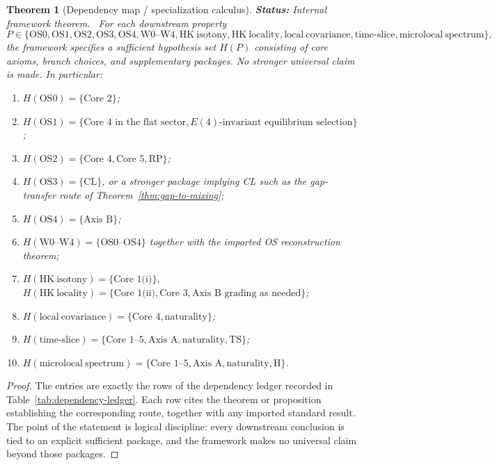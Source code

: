 \documentclass[12pt,a4paper]{article}
\theoremstyle{plain}
\newtheorem{theorem}{Theorem}[section]
\theoremstyle{definition}
\theoremstyle{remark}
\newcommand{\status}[1]{\textnormal{\textbf{Status:} #1.}\ }
\begin{document}
\begin{theorem}[Dependency map / specialization calculus]
  \label{thm:dependency-map}
  \status{Internal framework theorem}
  For each downstream property
  \[
    P \in \{
    \mathrm{OS0},\mathrm{OS1},\mathrm{OS2},\mathrm{OS3},\mathrm{OS4},
    \mathrm{W0\text{--}W4},
    \mathrm{HK\ isotony},
    \mathrm{HK\ locality},
    \mathrm{local\ covariance},
    \mathrm{time\text{-}slice},
    \mathrm{microlocal\ spectrum}
    \},
  \]
  the framework specifies a sufficient hypothesis set \(H(P)\)
  consisting of core axioms, branch choices, and supplementary
  packages. No stronger universal claim is made. In particular:
  \begin{enumerate}[nosep,label=(\roman*)]
  \item \(H(\mathrm{OS0}) = \{\text{Core 2}\}\);
  \item \(H(\mathrm{OS1}) = \{\text{Core 4 in the flat sector},
    E(4)\text{-invariant equilibrium selection}\}\);
  \item \(H(\mathrm{OS2}) = \{\text{Core 4},\text{Core 5},\mathrm{RP}\}\);
  \item \(H(\mathrm{OS3}) = \{\mathrm{CL}\}\), or a stronger package
    implying CL such as the gap-transfer route of
    Theorem~\ref{thm:gap-to-mixing};
  \item \(H(\mathrm{OS4}) = \{\text{Axis B}\}\);
  \item \(H(\mathrm{W0\text{--}W4}) = \{\mathrm{OS0\text{--}OS4}\}\)
    together with the imported OS reconstruction theorem;
  \item \(H(\mathrm{HK\ isotony}) = \{\text{Core 1(i)}\}\),
    \(H(\mathrm{HK\ locality}) = \{\text{Core 1(ii)},\text{Core 3},
    \text{Axis B grading as needed}\}\);
  \item \(H(\mathrm{local\ covariance}) = \{\text{Core 4},
    \text{naturality}\}\);
  \item \(H(\mathrm{time\text{-}slice}) = \{\text{Core 1--5},
    \text{Axis A},\text{naturality},\mathrm{TS}\}\);
  \item \(H(\mathrm{microlocal\ spectrum}) = \{\text{Core 1--5},
    \text{Axis A},\text{naturality},\mathrm{H}\}\).
  \end{enumerate}
\end{theorem}
\begin{proof}
  The entries are exactly the rows of the dependency ledger recorded
  in Table~\ref{tab:dependency-ledger}. Each row cites the theorem or
  proposition establishing the corresponding route, together with any
  imported standard result. The point of the statement is logical
  discipline: every downstream conclusion is tied to an explicit
  sufficient package, and the framework makes no universal claim
  beyond those packages.
\end{proof}
\end{document}
